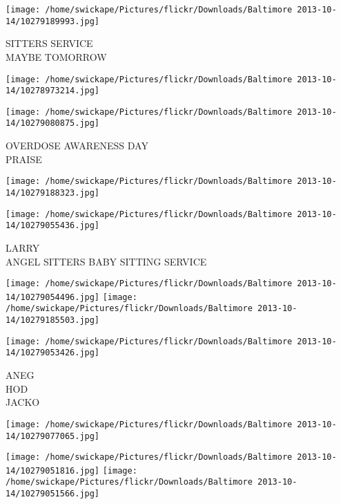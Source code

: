 \documentclass[10pt,letterpaper]{article}
\begin{document}
\vspace{0.25in}
\texttt{[image: /home/swickape/Pictures/flickr/Downloads/Baltimore 2013-10-14/10279189993.jpg]}

SITTERS SERVICE\\
MAYBE TOMORROW\\
\pagebreak

\texttt{[image: /home/swickape/Pictures/flickr/Downloads/Baltimore 2013-10-14/10278973214.jpg]}

\vspace{0.25in}
\texttt{[image: /home/swickape/Pictures/flickr/Downloads/Baltimore 2013-10-14/10279080875.jpg]}

OVERDOSE AWARENESS DAY\\
PRAISE\\
\pagebreak

\texttt{[image: /home/swickape/Pictures/flickr/Downloads/Baltimore 2013-10-14/10279188323.jpg]}

\vspace{0.25in}
\texttt{[image: /home/swickape/Pictures/flickr/Downloads/Baltimore 2013-10-14/10279055436.jpg]}

LARRY\\
ANGEL SITTERS BABY SITTING SERVICE\\
\pagebreak

\texttt{[image: /home/swickape/Pictures/flickr/Downloads/Baltimore 2013-10-14/10279054496.jpg]}
\texttt{[image: /home/swickape/Pictures/flickr/Downloads/Baltimore 2013-10-14/10279185503.jpg]}

\vspace{0.25in}
\texttt{[image: /home/swickape/Pictures/flickr/Downloads/Baltimore 2013-10-14/10279053426.jpg]}

ANEG\\
HOD\\
JACKO\\
\pagebreak

\texttt{[image: /home/swickape/Pictures/flickr/Downloads/Baltimore 2013-10-14/10279077065.jpg]}

\vspace{0.25in}
\texttt{[image: /home/swickape/Pictures/flickr/Downloads/Baltimore 2013-10-14/10279051816.jpg]}
\texttt{[image: /home/swickape/Pictures/flickr/Downloads/Baltimore 2013-10-14/10279051566.jpg]}
\end{document}
